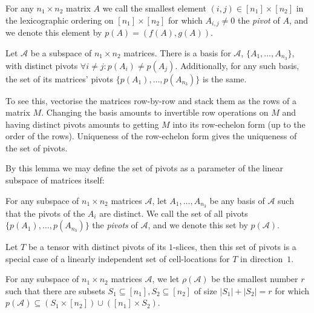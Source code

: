 \documentclass{daj}
\begin{document}
\begin{definition}
    For any $n_1 \times n_2$ matrix $A$ we call the smallest element $(i,j) \in [n_1] \times [n_2]$ in the lexicographic ordering on $[n_1] \times [n_2]$ for which $A_{i,j} \neq 0$ the \emph{pivot} of $A$, and we denote this element by $p(A)=(f(A),g(A))$. 
\end{definition}

%
%

\begin{lemma}\label{lem:pivot-set-invariant}
    Let $\mathcal{A}$ be a subspace of $n_1\times n_2$ matrices. There is a basis for $\mathcal{A}$, $\{A_1,\dots,A_{n_3}\}$, with distinct pivots $\forall i\neq j: p(A_i)\neq p(A_j)$.
    Additionally, for any such basis, the set of its matrices' pivots $\{p(A_1),\dots,p(A_{n_3})\}$ is the same.
\end{lemma}
To see this, vectorise the matrices row-by-row and stack them as the rows of a matrix $M$. Changing the basis amounts to invertible row operations on $M$ and having distinct pivots amounts to getting $M$ into its row-echelon form (up to the order of the rows). Uniqueness of the row-echelon form gives the uniqueness of the set of pivots.
%

%

By this lemma we may define the set of pivots as a parameter of the linear subspace of matrices itself:

\begin{definition}\label{def:pivots-space}
    For any subspace of $n_1 \times n_2$ matrices $\mathcal{A}$, let $A_1, \ldots, A_{n_3}$ be any basis of $\mathcal{A}$ such that the pivots of the $A_i$ are distinct. We call the set of all pivots $\{p(A_1), \ldots, p(A_{n_3})\}$ the \emph{pivots} of $\mathcal{A}$, and we denote this set by $p(\mathcal{A})$. 
\end{definition}

\begin{remark}\label{rem:pivots-as-cell-locations}
    Let $T$ be a tensor with distinct pivots of its $1$-slices, then this set of pivots is a special case of a linearly independent set of cell-locations for $T$ in direction~$1$.
\end{remark}

%
%
%
%
%

%

%
%
%

\begin{definition}\label{def:rho}
    For any subspace of $n_1 \times n_2$ matrices $\mathcal{A}$, we let $\rho(\mathcal{A})$ be the smallest number $r$ such that there are subsets $S_1 \subseteq [n_1], S_2 \subseteq [n_2]$ of size $|S_1| + |S_2| = r$ for which $p(\mathcal{A}) \subseteq (S_1 \times [n_2]) \cup ([n_1] \times S_2)$.
\end{definition}
\end{document}
